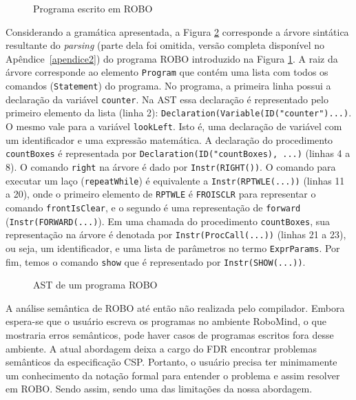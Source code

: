 \begin{figure}[!h]
\caption{Programa escrito em ROBO}

\label{fig:roboprogram}
\end{figure}

Considerando a gramática apresentada, a Figura \ref{fig:ast1} corresponde a árvore sintática resultante do \textit{parsing} (parte dela foi omitida, versão completa disponível no Apêndice~\ref{apendice2}) do programa ROBO introduzido na Figura \ref{fig:roboprogram}. A raiz da árvore corresponde ao elemento \texttt{Program} que contém uma lista com todos os comandos (\texttt{Statement}) do programa. No programa, a primeira linha possui a declaração da variável \texttt{counter}. Na AST essa declaração é representado pelo primeiro elemento da lista (linha 2): \texttt{Declaration(Variable(ID("counter")...)}. O mesmo vale para a variável \texttt{lookLeft}. Isto é, uma declaração de variável com um identificador e uma expressão matemática. A declaração do procedimento \texttt{countBoxes} é representada por \texttt{Declaration(ID("countBoxes), ...)} (linhas 4 a 8). O comando \texttt{right} na árvore é dado por \texttt{Instr(RIGHT())}. O comando para executar um laço (\texttt{repeatWhile}) é equivalente a \texttt{Instr(RPTWLE(...))} (linhas 11 a 20), onde o primeiro elemento de \texttt{RPTWLE} é \texttt{FROISCLR} para representar o comando \texttt{frontIsClear}, e o segundo é uma representação de \texttt{forward} (\texttt{Instr(FORWARD(...)}). Em uma chamada do procedimento \texttt{countBoxes}, sua representação na árvore é denotada por \texttt{Instr(ProcCall(...))} (linhas 21 a 23), ou seja, um identificador, e uma lista de parâmetros no termo \texttt{ExprParams}. Por fim, temos o comando \texttt{show} que é representado por \texttt{Instr(SHOW(...))}.

\begin{figure}[!h]
\centering
\caption{AST de um programa ROBO}

\label{fig:ast1}
\end{figure}

A análise semântica de ROBO até então não realizada pelo compilador. Embora espera-se que o usuário escreva os programas no ambiente RoboMind, o que mostraria erros semânticos, pode haver casos de programas escritos fora desse ambiente. A atual abordagem deixa a cargo do FDR encontrar problemas semânticos da especificação CSP. Portanto, o usuário precisa ter minimamente um conhecimento da notação formal para entender o problema e assim resolver em ROBO. Sendo assim, sendo uma das limitações da nossa abordagem.

